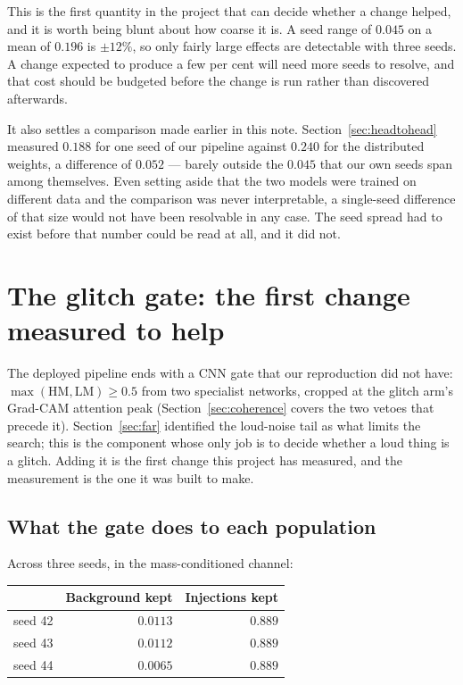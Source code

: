 \documentclass[11pt]{article}
\begin{document}
This is the first quantity in the project that can decide whether a change helped, and it
is worth being blunt about how coarse it is. A seed range of $0.045$ on a mean of $0.196$
is $\pm 12\%$, so only fairly large effects are detectable with three seeds. A change
expected to produce a few per cent will need more seeds to resolve, and that cost should
be budgeted before the change is run rather than discovered afterwards.

It also settles a comparison made earlier in this note. Section~\ref{sec:headtohead}
measured $0.188$ for one seed of our pipeline against $0.240$ for the distributed
weights, a difference of $0.052$ --- barely outside the $0.045$ that our own seeds span
among themselves. Even setting aside that the two models were trained on different data
and the comparison was never interpretable, a single-seed difference of that size would
not have been resolvable in any case. The seed spread had to exist before that number
could be read at all, and it did not.

\section{The glitch gate: the first change measured to help}
\label{sec:gate}

The deployed pipeline ends with a CNN gate that our reproduction did not have:
$\max(\mathrm{HM}, \mathrm{LM}) \geq 0.5$ from two specialist networks, cropped at the
glitch arm's Grad-CAM attention peak (Section~\ref{sec:coherence} covers the two vetoes
that precede it). Section~\ref{sec:far} identified the loud-noise tail as what limits the
search; this is the component whose only job is to decide whether a loud thing is a
glitch. Adding it is the first change this project has measured, and the measurement is
the one it was built to make.

\subsection*{What the gate does to each population}

Across three seeds, in the mass-conditioned channel:

\begin{center}
\begin{tabular}{lrr}
\toprule
 & Background kept & Injections kept \\
\midrule
seed 42 & $0.0113$ & $0.889$ \\
seed 43 & $0.0112$ & $0.889$ \\
seed 44 & $0.0065$ & $0.889$ \\
\bottomrule
\end{tabular}
\end{center}
\end{document}
